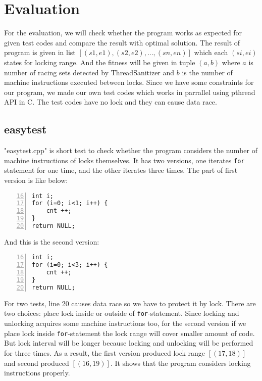 \section{Evaluation}
\label{sec:eval}

For the evaluation, we will check whether the program works as expected for given test codes and compare the result with optimal solution. The result of program is given in list $[(s1, e1), (s2, e2), ..., (sn, en)]$ which each $(si, ei)$ states for locking range. And the fitness will be given in tuple $(a, b)$ where $a$ is number of racing sets detected by ThreadSanitizer and $b$ is the number of machine instructions executed between locks. Since we have some constraints for our program, we made our own test codes which works in parrallel using pthread API in C. The test codes have no lock and they can cause data race.

\subsection{easytest}
"easytest.cpp" is short test to check whether the program considers the number of machine instructions of locks themselves. It has two versions, one iterates \verb|for| statement for one time, and the other iterates three times. The part of first version is like below:

\begin{lstlisting}[frame=tb, xleftmargin=2em, framexleftmargin=1.5em, numbers=left, firstnumber=16]
int i;
for (i=0; i<1; i++) {
    cnt ++;
}
return NULL;
\end{lstlisting}

And this is the second version:

\begin{lstlisting}[frame=tb, xleftmargin=2em, framexleftmargin=1.5em, numbers=left, firstnumber=16]
int i;
for (i=0; i<3; i++) {
    cnt ++;
}
return NULL;
\end{lstlisting}

For two tests, line 20 causes data race so we have to protect it by lock. There are two choices: place lock inside or outside of \verb|for|-statement. Since locking and unlocking acquires some machine instructions too, for the second version if we place lock inside \verb|for|-statement the lock range will cover smaller amount of code. But lock interval will be longer because locking and unlocking will be performed for three times.
As a result, the first version produced lock range $[(17, 18)]$ and second produced $[(16, 19)]$. It shows that the program considers locking instructions properly.

